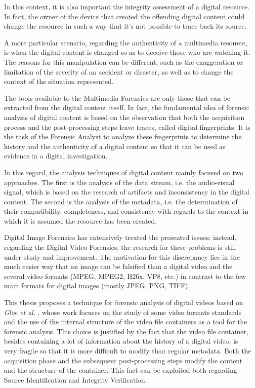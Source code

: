 In this context, it is also important the integrity assessment of a digital resource. In fact, the owner of the device that created the offending digital content could change the resource in such a way that it's not possible to trace back its source.

A more particular scenario, regarding the authenticity of a multimedia resource, is when the digital content is changed so as to deceive those who are watching it. The reasons for this manipulation can be different, such as the exaggeration or limitation of the severity of an accident or disaster, as well as to change the context of the situation represented.

The tools available to the Multimedia Forensics are only those that can be extracted from the digital content itself. In fact, the fundamental idea of forensic analysis of digital content is based on the observation that both the acquisition process and the post-processing steps leave traces, called digital fingerprints. It is the task of the Forensic Analyst to analyze these fingerprints to determine the history and the authenticity of a digital content so that it can be used as evidence in a digital investigation.

In this regard, the analysis techniques of digital content mainly focused on two approaches. The first is the analysis of the data stream, i.e. the audio-visual signal, which is based on the research of artifacts and inconsistency in the digital content. The second is the analysis of the metadata, i.e. the determination of their compatibility, completeness, and consistency \cite{Piva} with regards to the context in which it is assumed the resource has been created.

Digital Image Forensics has extensively treated the presented issues; instead, regarding the Digital Video Forensics, the research for these problems is still under study and improvement. The motivation for this discrepancy lies in the much easier way that an image can be falsified than a digital video and the several video formats (MPEG, MPEG2, H26x, VP8, etc.) in contrast to the few main formats for digital images (mostly JPEG, PNG, TIFF).

This thesis proposes a technique for forensic analysis of digital videos based on \emph{Gloe et al.} \cite{Gloe2014S68}, whose work focuses on the study of some video formats standards and the use of the internal structure of the video file containers as a tool for the forensic analysis. This choice is justified by the fact that the video file container, besides containing a lot of information about the history of a digital video, is very fragile so that it is more difficult to modify than regular metadata. Both the acquisition phase and the subsequent post-processing steps modify the content and the structure of the container. This fact can be exploited both regarding Source Identification and Integrity Verification.


